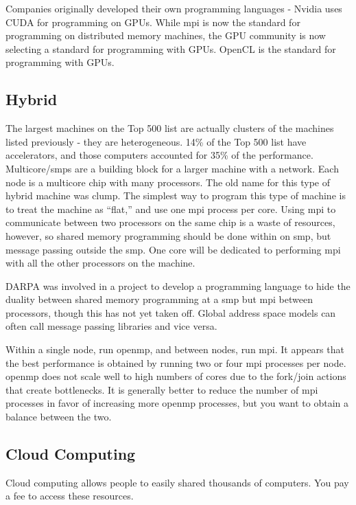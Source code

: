 \documentclass[10pt]{article}
\begin{document}
\begin{flushleft}
Companies originally developed their own programming languages - Nvidia uses CUDA for programming on GPUs. While \gls{mpi} is now the standard for programming on distributed memory machines, the GPU community is now selecting a standard for programming with GPUs. OpenCL is the standard for programming with GPUs. 

\subsection{Hybrid}

The largest machines on the Top 500 list are actually clusters of the machines listed previously - they are heterogeneous. 14\% of the Top 500 list have accelerators, and those computers accounted for 35\% of the performance. Multicore/\gls{smp}s are a building block for a larger machine with a network. Each node is a multicore chip with many processors. The old name for this type of hybrid machine was \gls{clump}. The simplest way to program this type of machine is to treat the machine as ``flat,'' and use one \gls{mpi} process per core. Using \gls{mpi} to communicate between two processors on the same chip is a waste of resources, however, so shared memory programming should be done within on \gls{smp}, but message passing outside the \gls{smp}. One core will be dedicated to performing \gls{mpi} with all the other processors on the machine. 

DARPA was involved in a project to develop a programming language to hide the duality between shared memory programming at a \gls{smp} but \gls{mpi} between processors, though this has not yet taken off. Global address space models can often call message passing libraries and vice versa. 

Within a single node, run \gls{openmp}, and between nodes, run \gls{mpi}. It appears that the best performance is obtained by running two or four \gls{mpi} processes per node. \gls{openmp} does not scale well to high numbers of cores due to the fork/join actions that create bottlenecks. It is generally better to reduce the number of \gls{mpi} processes in favor of increasing more \gls{openmp} processes, but you want to obtain a balance between the two.

\subsection{Cloud Computing}

Cloud computing allows people to easily shared thousands of computers. You pay a fee to access these resources.


\end{flushleft}
\end{document}
